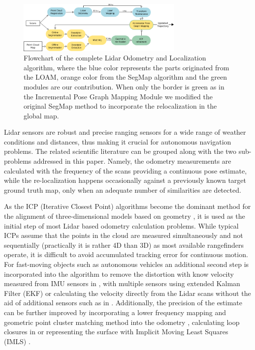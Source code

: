 \documentclass[letterpaper, 10 pt, conference]{ieeeconf}  %
\begin{document}
\begin{figure}[!h]
\centerline{\includegraphics[width=0.72\textwidth]{figures/lol_flowchart_5.png}}\par
\caption{Flowchart of the complete Lidar Odometry and Localization algorithm, where the blue color represents the parts originated from the LOAM, orange color from the SegMap algorithm and the green modules are our contribution. When only the border is green as in the Incremental Pose Graph Mapping Module we modified the original SegMap method to incorporate the relocalization in the global map.}
\label{fig:loam-segmap_flowchart}
\end{figure}

Lidar sensors are robust and precise ranging sensors for a wide range of weather conditions and distances, thus making it crucial for autonomous navigation problems. 
The related scientific literature can be grouped along with the two sub-problems addressed in this paper. Namely, the odometry measurements are calculated with the frequency of the scans providing a continuous pose estimate, while the re-localization happens occasionally against a previously known target ground truth map, only when an adequate number of similarities are detected.

As the ICP (Iterative Closest Point) algorithms become the dominant method for the alignment of three-dimensional models based on geometry \cite{essential_icp}, it is used as the initial step of most Lidar based odometry calculation problems. While typical ICPs assume that the points in the cloud are measured simultaneously and not sequentially (practically it is rather 4D than 3D) as most available rangefinders operate, it is difficult to avoid accumulated tracking error for continuous motion. For fast-moving objects such as autonomous vehicles an additional second step is incorporated into the algorithm to remove the distortion with know velocity measured from IMU sensors in \cite{imu_icp}, with multiple sensors using extended Kalman Filter (EKF) \cite{ekf_icp} or calculating the velocity directly from the Lidar scans without the aid of additional sensors such as in \cite{vicp}. Additionally, the precision of the estimate can be further improved by incorporating a lower frequency mapping and geometric point cluster matching method into the odometry \cite{zlot}, calculating loop closures in \cite{bosse} or representing the surface with Implicit Moving Least Squares (IMLS) \cite{imls_icp}. 
\end{document}
